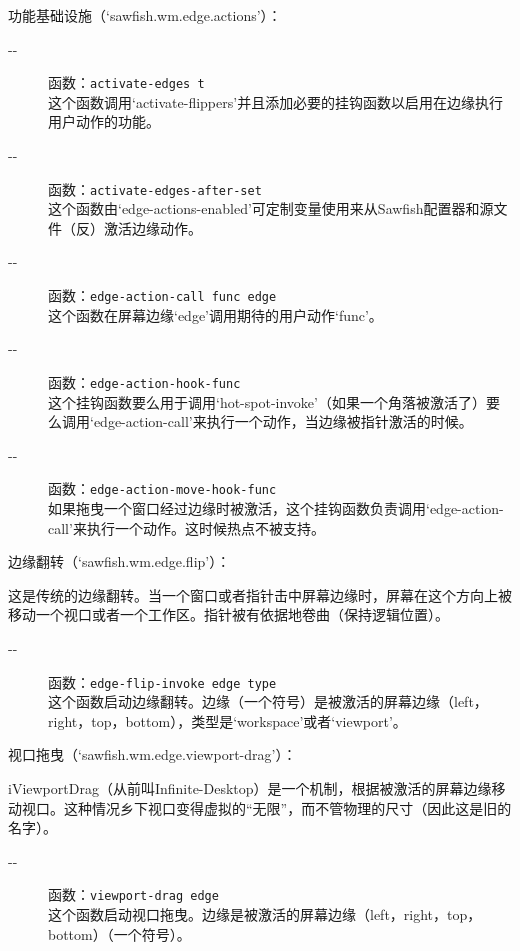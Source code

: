 \documentclass{book}
\begin{document}
\begin{CJK*}{UTF8}{gbsn}
\begin{description}
\end{description}

功能基础设施（`sawfish.wm.edge.actions'）：
\begin{description}
\item[-{}-] 函数：\verb|activate-edges t|\\
这个函数调用`activate-flippers'并且添加必要的挂钩函数以启用在边缘执行用户动作的功能。
\item[-{}-] 函数：\verb|activate-edges-after-set|\\
这个函数由`edge-actions-enabled'可定制变量使用来从Sawfish配置器和源文件（反）激活边缘动作。
\item[-{}-] 函数：\verb|edge-action-call func edge|\\
这个函数在屏幕边缘`edge'调用期待的用户动作`func'。
\item[-{}-] 函数：\verb|edge-action-hook-func|\\
这个挂钩函数要么用于调用`hot-spot-invoke'（如果一个角落被激活了）要么调用`edge-action-call'来执行一个动作，当边缘被指针激活的时候。
\item[-{}-] 函数：\verb|edge-action-move-hook-func|\\
如果拖曳一个窗口经过边缘时被激活，这个挂钩函数负责调用`edge-action-call'来执行一个动作。这时候热点不被支持。
\end{description}

边缘翻转（`sawfish.wm.edge.flip'）：

这是传统的边缘翻转。当一个窗口或者指针击中屏幕边缘时，屏幕在这个方向上被移动一个视口或者一个工作区。指针被有依据地卷曲（保持逻辑位置）。
\begin{description}
\item[-{}-] 函数：\verb|edge-flip-invoke edge type|\\
这个函数启动边缘翻转。边缘（一个符号）是被激活的屏幕边缘（left，right，top，bottom），类型是`workspace'或者`viewport'。
\end{description}

视口拖曳（`sawfish.wm.edge.viewport-drag'）：

iViewportDrag（从前叫Infinite-Desktop）是一个机制，根据被激活的屏幕边缘移动视口。这种情况乡下视口变得虚拟的``无限''，而不管物理的尺寸（因此这是旧的名字）。
\begin{description}
\item[-{}-] 函数：\verb|viewport-drag edge|\\
这个函数启动视口拖曳。边缘是被激活的屏幕边缘（left，right，top，bottom）（一个符号）。
\end{description}


\end{CJK*}
\end{document}
